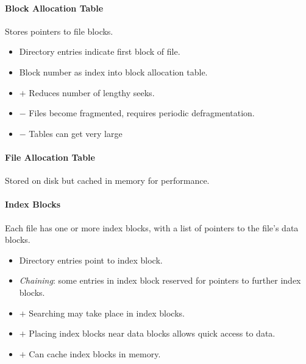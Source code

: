 \documentclass[twocolumn,english]{article}
\begin{document}
\paragraph{Block Allocation Table}

Stores pointers to file blocks.
\begin{itemize}
\item Directory entries indicate first block of file.
\item Block number as index into block allocation table.
\item $+$ Reduces number of lengthy seeks.
\item $-$ Files become fragmented, requires periodic defragmentation.
\item $-$ Tables can get very large
\end{itemize}

\paragraph{File Allocation Table}

Stored on disk but cached in memory for performance.

\paragraph{Index Blocks}

Each file has one or more index blocks, with a list of pointers to
the file's data blocks.
\begin{itemize}
\item Directory entries point to index block.
\item \emph{Chaining}: some entries in index block reserved for pointers
to further index blocks.
\item $+$ Searching may take place in index blocks.
\item $+$ Placing index blocks near data blocks allows quick access to
data.
\item $+$ Can cache index blocks in memory.
\end{itemize}
\end{document}
